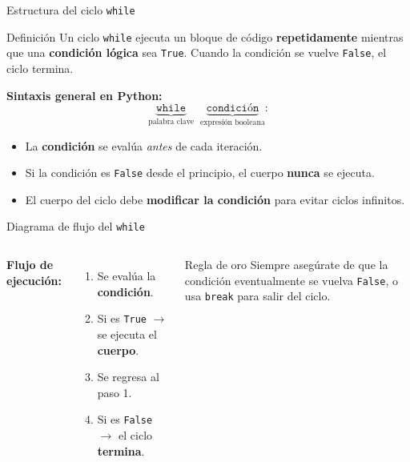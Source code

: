 \documentclass[aspectratio=169,xcolor=dvipsnames]{beamer}
\begin{document}
\begin{frame}{Estructura del ciclo \texttt{while}}
    \begin{block}{Definici\'on}
        Un ciclo \texttt{while} ejecuta un bloque de c\'odigo \textbf{repetidamente}
        mientras que una \textbf{condici\'on l\'ogica} sea \texttt{True}.
        Cuando la condici\'on se vuelve \texttt{False}, el ciclo termina.
    \end{block}

    \vspace{0.3cm}
    \textbf{Sintaxis general en Python:}
    \[
    \underbrace{\texttt{while}}_{\text{palabra clave}}\;\;
    \underbrace{\texttt{condici\'on}}_{\text{expresi\'on booleana}}\texttt{:}
    \]
    \begin{itemize}
        \item La \textbf{condici\'on} se eval\'ua \emph{antes} de cada iteraci\'on.
        \item Si la condici\'on es \texttt{False} desde el principio, el cuerpo \textbf{nunca} se ejecuta.
        \item El cuerpo del ciclo debe \textbf{modificar la condici\'on} para evitar ciclos infinitos.
    \end{itemize}
\end{frame}

\begin{frame}{Diagrama de flujo del \texttt{while}}
    \begin{columns}
        \textbf{Flujo de ejecuci\'on:}
        \begin{enumerate}
            \item Se eval\'ua la \textbf{condici\'on}.
            \item Si es \texttt{True} $\rightarrow$ se ejecuta el \textbf{cuerpo}.
            \item Se regresa al paso 1.
            \item Si es \texttt{False} $\rightarrow$ el ciclo \textbf{termina}.
        \end{enumerate}

        \begin{alertblock}{Regla de oro}
            Siempre aseg\'urate de que la condici\'on eventualmente se vuelva \texttt{False},
            o usa \texttt{break} para salir del ciclo.
        \end{alertblock}
    \end{columns}
\end{frame}
\end{document}
